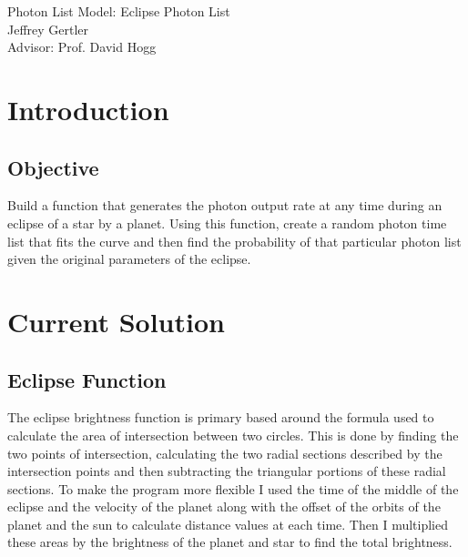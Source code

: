 \documentclass[aps,letterpaper,10pt]{revtex4}
\begin{document}
\begin{center}
{\LARGE Photon List Model: Eclipse Photon List \\ \vspace{14pt}}
Jeffrey Gertler \\ \vspace{14pt}
Advisor: Prof. David Hogg \\ \vspace{14pt}

\end{center}
\vspace{5mm}

\section{Introduction}
\subsection{Objective}
Build a function that generates the photon output rate at any time during an eclipse of a star by a planet. Using this function, create a random photon time list that fits the curve and then find the probability of that particular photon list given the original parameters of the eclipse.

\vspace{3mm}



\section{Current Solution}

\subsection{Eclipse Function}
The eclipse brightness function is primary based around the formula used to calculate the area of intersection between two circles. This is done by finding the two points of intersection, calculating the two radial sections described by the intersection points and then subtracting the triangular portions of these radial sections. To make the program more flexible I used the time of the middle of the eclipse and the velocity of the planet along with the offset of the orbits of the planet and the sun to calculate distance values at each time. Then I multiplied these areas by the brightness of the planet and star to find the total brightness. \\
\end{document}
